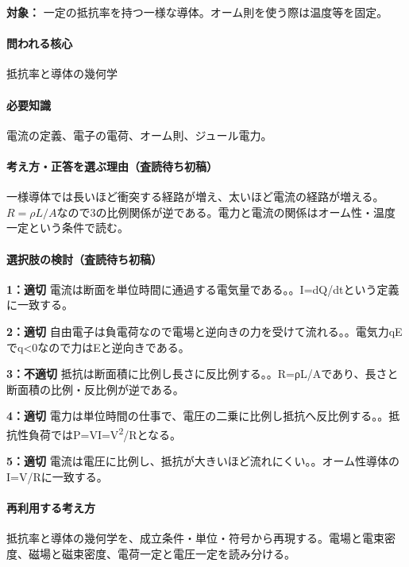 \noindent\textbf{対象：} 一定の抵抗率を持つ一様な導体。オーム則を使う際は温度等を固定。\par

\paragraph{問われる核心} 抵抗率と導体の幾何学

\paragraph{必要知識} 電流の定義、電子の電荷、オーム則、ジュール電力。

\paragraph{考え方・正答を選ぶ理由（査読待ち初稿）} 一様導体では長いほど衝突する経路が増え、太いほど電流の経路が増える。\(R=\rho L/A\)なので3の比例関係が逆である。電力と電流の関係はオーム性・温度一定という条件で読む。

\paragraph{選択肢の検討（査読待ち初稿）}\mbox{}\par

\noindent\textbf{1：適切} 電流は断面を単位時間に通過する電気量である。。I=\allowbreak{}dQ/dtという定義に一致する。\par

\noindent\textbf{2：適切} 自由電子は負電荷なので電場と逆向きの力を受けて流れる。。電気力qEでq<0なので力はEと逆向きである。\par

\noindent\textbf{3：不適切} 抵抗は断面積に比例し長さに反比例する。。R=ρL/Aであり、長さと断面積の比例・反比例が逆である。\par

\noindent\textbf{4：適切} 電力は単位時間の仕事で、電圧の二乗に比例し抵抗へ反比例する。。抵抗性負荷ではP=\allowbreak{}VI=\allowbreak{}V\textsuperscript{2}/Rとなる。\par

\noindent\textbf{5：適切} 電流は電圧に比例し、抵抗が大きいほど流れにくい。。オーム性導体のI=\allowbreak{}V/Rに一致する。\par

\paragraph{再利用する考え方} 抵抗率と導体の幾何学を、成立条件・単位・符号から再現する。電場と電束密度、磁場と磁束密度、電荷一定と電圧一定を読み分ける。

